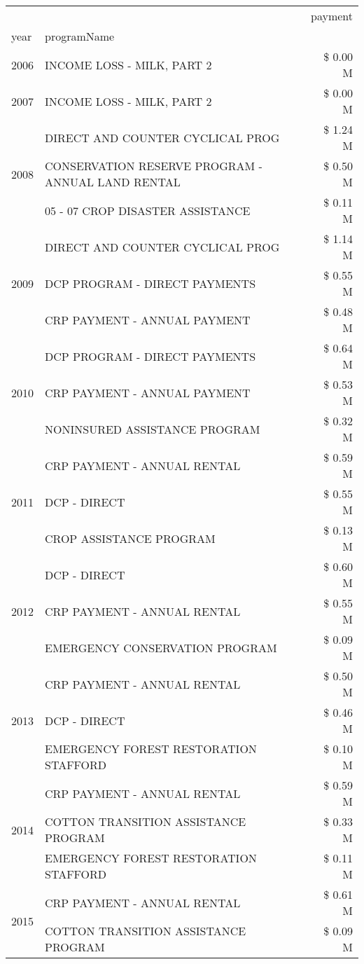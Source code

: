 \begin{tabular}{llr}
\toprule
 &  & payment \\
year & programName &  \\
\midrule
2006 & INCOME LOSS - MILK, PART 2 & \$ 0.00 M \\
\cline{1-3}
2007 & INCOME LOSS - MILK, PART 2 & \$ 0.00 M \\
\cline{1-3}
\multirow[t]{3}{*}{2008} & DIRECT AND COUNTER CYCLICAL PROG & \$ 1.24 M \\
 & CONSERVATION RESERVE PROGRAM - ANNUAL LAND RENTAL & \$ 0.50 M \\
 & 05 - 07 CROP DISASTER ASSISTANCE & \$ 0.11 M \\
\cline{1-3}
\multirow[t]{3}{*}{2009} & DIRECT AND COUNTER CYCLICAL PROG & \$ 1.14 M \\
 & DCP PROGRAM - DIRECT PAYMENTS & \$ 0.55 M \\
 & CRP PAYMENT - ANNUAL PAYMENT & \$ 0.48 M \\
\cline{1-3}
\multirow[t]{3}{*}{2010} & DCP PROGRAM - DIRECT PAYMENTS & \$ 0.64 M \\
 & CRP PAYMENT - ANNUAL PAYMENT & \$ 0.53 M \\
 & NONINSURED ASSISTANCE PROGRAM & \$ 0.32 M \\
\cline{1-3}
\multirow[t]{3}{*}{2011} & CRP PAYMENT - ANNUAL RENTAL & \$ 0.59 M \\
 & DCP - DIRECT & \$ 0.55 M \\
 & CROP ASSISTANCE PROGRAM & \$ 0.13 M \\
\cline{1-3}
\multirow[t]{3}{*}{2012} & DCP - DIRECT & \$ 0.60 M \\
 & CRP PAYMENT - ANNUAL RENTAL & \$ 0.55 M \\
 & EMERGENCY CONSERVATION PROGRAM & \$ 0.09 M \\
\cline{1-3}
\multirow[t]{3}{*}{2013} & CRP PAYMENT - ANNUAL RENTAL & \$ 0.50 M \\
 & DCP - DIRECT & \$ 0.46 M \\
 & EMERGENCY FOREST RESTORATION STAFFORD & \$ 0.10 M \\
\cline{1-3}
\multirow[t]{3}{*}{2014} & CRP PAYMENT - ANNUAL RENTAL & \$ 0.59 M \\
 & COTTON TRANSITION ASSISTANCE PROGRAM & \$ 0.33 M \\
 & EMERGENCY FOREST RESTORATION STAFFORD & \$ 0.11 M \\
\cline{1-3}
\multirow[t]{3}{*}{2015} & CRP PAYMENT - ANNUAL RENTAL & \$ 0.61 M \\
 & COTTON TRANSITION ASSISTANCE PROGRAM & \$ 0.09 M \\

\end{tabular}
